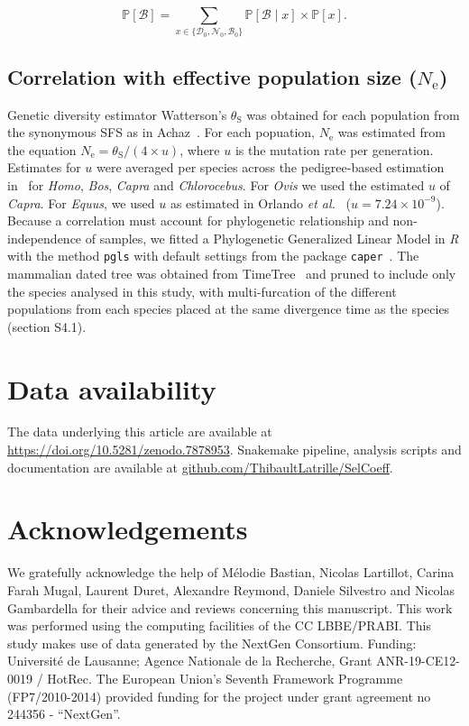 \documentclass{article}
\newcommand{\Ne}{N_{\text{e}}}
\newcommand{\proba}{\mathbb{P}}
\newcommand{\SphyDel}{\mathcal{D}_0}
\newcommand{\SphyNeu}{\mathcal{N}_0}
\newcommand{\SphyBen}{\mathcal{B}_0}
\newcommand{\Sphyclass}{x}
\newcommand{\given}{\mid}
\newcommand{\SpopBen}{\mathcal{B}}
\newcommand{\thetaSyn}{\theta_{\text{S}}}
\begin{document}
    \begin{equation}
        \proba [ \SpopBen ] = \sum_{\Sphyclass \in \{\SphyDel, \SphyNeu, \SphyBen \} }\proba [\SpopBen \given \Sphyclass ] \times \proba [\Sphyclass ].
        \label{eq:total_proba}
    \end{equation}

    \subsection{Correlation with effective population size ($\Ne$)}
    \label{subsec:correlation-diversity}
    Genetic diversity estimator Watterson's $\thetaSyn$ was obtained for each population from the synonymous SFS as in Achaz~\cite{achaz_frequency_2009}.
    For each popuation, $\Ne$ was estimated from the equation $\Ne=\thetaSyn / (4 \times u)$, where $u$ is the mutation rate per generation.
    Estimates for $u$ were averaged per species across the pedigree-based estimation in~\cite{bergeron_evolution_2023} for \textit{Homo}, \textit{Bos}, \textit{Capra} and \textit{Chlorocebus}.
    For \textit{Ovis} we used the estimated $u$ of \textit{Capra}.
    For \textit{Equus}, we used $u$ as estimated in Orlando \textit{et al.}~\cite{orlando_recalibrating_2013} ($u=7.24\times10^{-9}$).
    Because a correlation must account for phylogenetic relationship and non-independence of samples, we fitted a Phylogenetic Generalized Linear Model in \textit{R} with the method \texttt{pgls} with default settings from the package \texttt{caper}~\cite{orme_caper_2013}.
    The mammalian dated tree was obtained from TimeTree~\cite{kumar_timetree_2017} and pruned to include only the species analysed in this study, with multi-furcation of the different populations from each species placed at the same divergence time as the species (section S4.1).

    \section*{Data availability}
    The data underlying this article are available at \url{https://doi.org/10.5281/zenodo.7878953}.
    Snakemake pipeline, analysis scripts and documentation are available at \href{https://github.com/ThibaultLatrille/SelCoeff}{github.com/ThibaultLatrille/SelCoeff}.

    \section*{Acknowledgements}
    \label{sec:acknowledgment}
    We gratefully acknowledge the help of Mélodie Bastian, Nicolas Lartillot, Carina Farah Mugal, Laurent Duret, Alexandre Reymond, Daniele Silvestro and Nicolas Gambardella for their advice and reviews concerning this manuscript.
    This work was performed using the computing facilities of the CC LBBE/PRABI\@.
    This study makes use of data generated by the NextGen Consortium.
    Funding:
    Université de Lausanne; Agence Nationale de la Recherche, Grant ANR-19-CE12-0019 / HotRec.
    The European Union’s Seventh Framework Programme (FP7/2010-2014) provided funding for the project under grant agreement no 244356 - “NextGen”.
\end{document}
